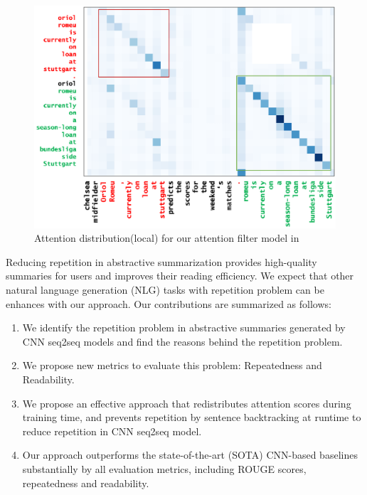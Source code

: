 {\begin{figure}[th!]
\centering
\includegraphics[width=0.9\linewidth]{map3}
\caption{Attention distribution(local) for our attention filter model in }
\label{fig:attn_map3}
\end{figure}
}%

Reducing repetition in abstractive summarization provides high-quality summaries for users and improves their reading efficiency.
We expect that other natural language generation (NLG) tasks with repetition problem can be enhances with our approach. 
Our contributions are summarized as follows:
\begin{enumerate}
\item We identify the repetition problem in abstractive summaries generated
by CNN seq2seq models and find the reasons behind the repetition problem.
\item We propose new metrics to evaluate this problem: Repeatedness and Readability.
\item We propose an effective approach that redistributes attention scores 
during training time, and prevents repetition by sentence backtracking
at runtime to reduce repetition in CNN seq2seq model.
\item Our approach
outperforms the state-of-the-art (SOTA) CNN-based baselines 
substantially by all evaluation metrics, including ROUGE scores, 
repeatedness and readability.
\end{enumerate}

